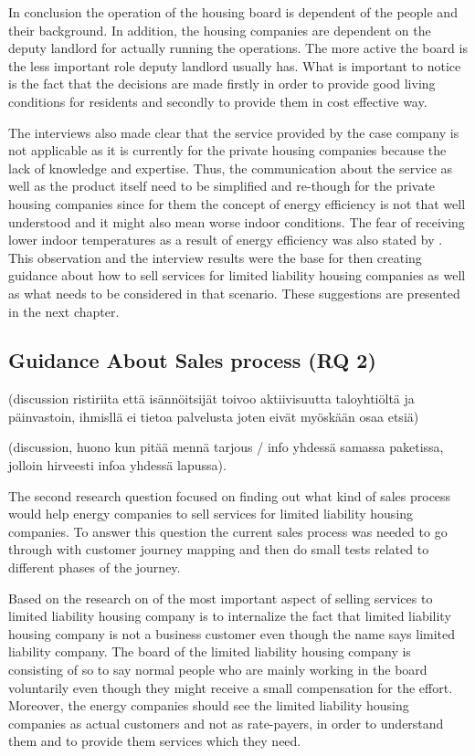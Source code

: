 In conclusion the operation of the housing board is dependent of the people and their background. In addition, the housing companies are dependent on the deputy landlord for actually running the operations. The more active the board is the less important role deputy landlord usually has. What is important to notice is the fact that the decisions are made firstly in order to provide good living conditions for residents and secondly to provide them in cost effective way.

The interviews also made clear that the service provided by the case company is not applicable as it is currently for the private housing companies because the lack of knowledge and expertise. Thus, the communication about the service  as well as the product itself need to be simplified and re-though for the private housing companies since for them the concept of energy efficiency is not that well understood and it might also mean worse indoor conditions. The fear of receiving lower indoor temperatures as a result of energy efficiency was also stated by \textcite{PehkonenThesis:2012}. This observation and the interview results were the base for then creating guidance about how to sell services for limited liability housing companies as well as what needs to be considered in that scenario. These suggestions are presented in the next chapter.

\subsection{Guidance About Sales process (RQ 2)}

(discussion ristiriita että isännöitsijät toivoo aktiivisuutta taloyhtiöltä ja päinvastoin, ihmisllä ei tietoa palvelusta joten eivät myöskään osaa etsiä)

(discussion, huono kun pitää mennä tarjous / info yhdessä samassa paketissa, jolloin hirveesti infoa yhdessä lapussa).

The second research question focused on finding out what kind of sales process would help energy companies to sell services for limited liability housing companies. To answer this question the current sales process was needed to go through with customer journey mapping and then do small tests related to different phases of the journey.

Based on the research on of the most important aspect of selling services to limited liability housing company is to internalize the fact that limited liability housing company is not a business customer even though the name says limited liability company. The board of the limited liability housing company is consisting of so to say normal people who are mainly working in the board voluntarily even though they might receive a small compensation for the effort. Moreover, the energy companies should see the limited liability housing companies as actual customers and not as rate-payers, in order to understand them and to provide them services which they need.

